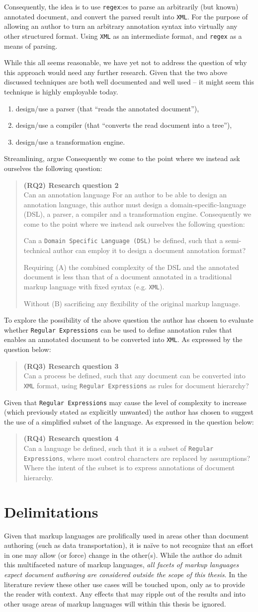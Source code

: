\documentclass{scrreprt}
\newcommand\researchquestionformat[1]{\begin{quote}#1\end{quote}}
\newcommand\secondresearchquestion{\researchquestionformat{%
  \textbf{(RQ2) Research question 2} \\
  Can an annotation language
  For an author to be able to design an annotation language, this author must design a domain-specific-language (DSL), a parser, a compiler and a transformation engine. Consequently we come to the point where we instead ask ourselves the following question:


  Can a \texttt{Domain Specific Language (DSL)} be defined, such that a semi-technical author can employ it to design a document annotation format?

  Requiring (A) the combined complexity of the DSL and the annotated document is less than that of a document annotated in a traditional markup language with fixed syntax (e.g. \texttt{XML}).

  Without (B) sacrificing any flexibility of the original markup language.
}}
\newcommand\thirdresearchquestion{\researchquestionformat{%
  \textbf{(RQ3) Research question 3} \\
  Can a process be defined, such that any document can be converted into \texttt{XML} format, using \texttt{Regular Expressions} as rules for document hierarchy?
}}
\newcommand\fourthresearchquestion{\researchquestionformat{%
  \textbf{(RQ4) Research question 4} \\
  Can a language be defined, such that it is a subset of \texttt{Regular Expressions}, where most control characters are replaced by assumptions? Where the intent of the subset is to express annotations of document hierarchy.
}}
\begin{document}
Consequently, the idea is to use \texttt{regex}:es to parse an arbitrarily (but known) annotated document, and convert the parsed result into \texttt{XML}. For the purpose of allowing an author to turn an arbitrary annotation syntax into virtually any other structured format. Using \texttt{XML} as an intermediate format, and \texttt{regex} as a means of parsing.

While this all seems reasonable, we have yet not to address the question of why this approach would need any further research. Given that the two above discussed techniques are both well documented and well used -- it might seem this technique is highly employable today.

\begin{enumerate}
\item design/use a parser (that ``reads the annotated document''),
\item design/use a compiler (that ``converts the read document into a tree''),
\item design/use a transformation engine.
\end{enumerate}


Streamlining,   argue  Consequently we come to the point where we instead ask ourselves the following question:

\secondresearchquestion

To explore the possibility of the above question the author has chosen to evaluate whether \texttt{Regular Expressions} can be used to define annotation rules that enables an annotated document to be converted into \texttt{XML}. As expressed by the question below:

\thirdresearchquestion

Given that \texttt{Regular Expressions} may cause the level of complexity to increase (which previously stated as explicitly unwanted) the author has chosen to suggest the use of a simplified subset of the language. As expressed in the question below:

\fourthresearchquestion


\section{Delimitations}
Given that markup languages are prolifically used in areas other than document authoring (such as data transportation), it is naïve to not recognize that an effort in one may allow (or force) change in the other(s). While the author do admit this multifaceted nature of markup languages, \emph{all facets of markup languages expect document authoring are considered outside the scope of this thesis}. In the literature review these other use cases will be touched upon, only as to provide the reader with context. Any effects that may ripple out of the results and into other usage areas of markup languages will within this thesis be ignored. 
\end{document}

